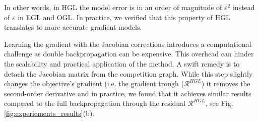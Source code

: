 In other words, in HGL the model error is in an order of magnitude of \(\varepsilon^2\) instead of \(\varepsilon\) in EGL and OGL. In practice, we verified that this property of HGL translates to more accurate gradient models.

Learning the gradient with the Jacobian corrections introduces a computational challenge as double backpropagation can be expensive. This overhead can hinder the scalability and practical application of the method. A swift remedy is to detach the Jacobian matrix from the competition graph. While this step slightly changes the objective's gradient (i.e. the gradient trough (\(\mathcal{R}^{HGL}\)) it removes the second-order derivative and in practice, we found that it achieves similar results compared to the full backpropagation through the residual \(\mathcal{R}^{HGL}\), see Fig. \ref{fig:experiements_results}(b).
